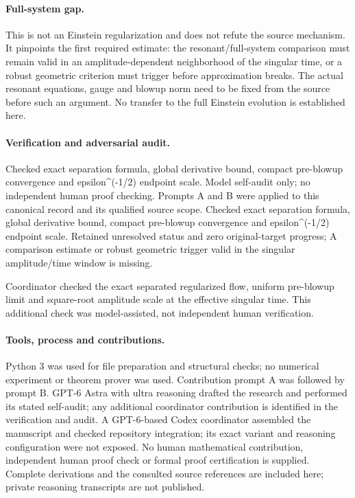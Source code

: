 \documentclass[11pt]{article}
\begin{document}
\paragraph{Full-system gap.} This is not an Einstein regularization and does not refute the source mechanism. It pinpoints the first required estimate: the resonant/full-system comparison must remain valid in an amplitude-dependent neighborhood of the singular time, or a robust geometric criterion must trigger before approximation breaks. The actual resonant equations, gauge and blowup norm need to be fixed from the source before such an argument. No transfer to the full Einstein evolution is established here.

\paragraph{Verification and adversarial audit.}
Checked exact separation formula, global derivative bound, compact pre-blowup convergence and epsilon\textasciicircum{}(-1/2) endpoint scale. Model self-audit only; no independent human proof checking. Prompts A and B were applied to this canonical record and its qualified source scope. Checked exact separation formula, global derivative bound, compact pre-blowup convergence and epsilon\textasciicircum{}(-1/2) endpoint scale. Retained unresolved status and zero original-target progress; A comparison estimate or robust geometric trigger valid in the singular amplitude/time window is missing.

Coordinator checked the exact separated regularized flow, uniform pre-blowup limit and square-root amplitude scale at the effective singular time. This additional check was model-assisted, not independent human verification.

\paragraph{Tools, process and contributions.}
Python 3 was used for file preparation and structural checks; no numerical experiment or theorem prover was used. Contribution prompt A was followed by prompt B. GPT-6 Astra with ultra reasoning drafted the research and performed its stated self-audit; any additional coordinator contribution is identified in the verification and audit. A GPT-6-based Codex coordinator assembled the manuscript and checked repository integration; its exact variant and reasoning configuration were not exposed. No human mathematical contribution, independent human proof check or formal proof certification is supplied. Complete derivations and the consulted source references are included here; private reasoning transcripts are not published.
\end{document}
